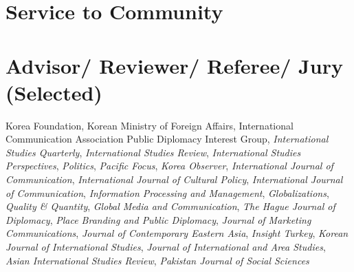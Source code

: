 \documentclass[11pt,a4paper,]{awesome-cv}
\begin{document}
\hypertarget{service-to-community}{%
\section{Service to Community}\label{service-to-community}}

\begin{cventries}
    \vspace{-4.0mm}
    \vspace{-4.0mm}
    \vspace{-4.0mm}
    \vspace{-4.0mm}
\end{cventries}

\hypertarget{advisor-reviewer-referee-jury-selected}{%
\section{Advisor/ Reviewer/ Referee/ Jury
(Selected)}\label{advisor-reviewer-referee-jury-selected}}

Korea Foundation, Korean Ministry of Foreign Affairs, International
Communication Association Public Diplomacy Interest Group,
\emph{International Studies Quarterly}, \emph{International Studies
Review}, \emph{International Studies Perspectives}, \emph{Politics},
\emph{Pacific Focus}, \emph{Korea Observer}, \emph{International Journal
of Communication}, \emph{International Journal of Cultural Policy},
\emph{International Journal of Communication}, \emph{Information
Processing and Management}, \emph{Globalizations}, \emph{Quality \&
Quantity}, \emph{Global Media and Communication}, \emph{The Hague
Journal of Diplomacy}, \emph{Place Branding and Public Diplomacy},
\emph{Journal of Marketing Communications}, \emph{Journal of
Contemporary Eastern Asia}, \emph{Insight Turkey}, \emph{Korean Journal
of International Studies}, \emph{Journal of International and Area
Studies}, \emph{Asian International Studies Review}, \emph{Pakistan
Journal of Social Sciences}
\end{document}
